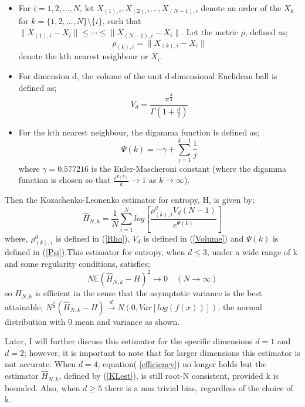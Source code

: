 \documentclass{article}
\begin{document}
\begin{itemize}

\item For $i = 1, 2, ..., N$, let $X_{(1), i}, X_{(2), i}, .., X_{(N-1), i}$ denote an order of the $X_{k}$ for $k = \{1, 2, ..., N\} \setminus \{i\}$, such that $\| X_{(1), i} - X_{i}\| \leq \cdots \leq \|  X_{(N-1), i} - X_{i}\| $. Let the metric $\rho$, defined as;
\begin{equation} \label{Rho}
\rho_{(k), i} = \| X_{(k), i} - X_{i}\|
\end{equation} denote the kth nearest neighbour or $X_{i}$.

\item  For dimension d, the volume of the unit d-dimensional Euclidean ball is defined as;
\begin{equation} \label{Volume}
V_{d} = \frac{\pi^\frac{d}{2}}{\Gamma(1 + \frac{d}{2})}
\end{equation}

\item For the kth nearest neighbour, the digamma function is defined as;
\begin{equation} \label{Psi}
\Psi(k) = -\gamma + \sum_{j=1}^{k-1} \frac{1}{j}
\end{equation}
where $\gamma = 0.577216$ is the Euler-Mascheroni constant (where the digamma function is chosen so that $\frac{e^{\Psi(k)}}{k}\to1$ as $k \to \infty$).

\end{itemize} Then the Kozachenko-Leonenko estimator for entropy, H, is given by;
\begin{equation} \label{KLest}
\hat{H}_{N, k} = \frac{1}{N} \sum_{i=1}^{N} log \left[ \frac{\rho_{(k),i}^{d} V_{d} (N-1)}{e^{\Psi(k)}} \right]
\end{equation} where, $\rho_{(k),i}^{d}$ is defined in (\ref{Rho}), $V_{d}$ is defined in (\ref{Volume}) and $\Psi(k)$ is defined in (\ref{Psi}).This estimator for entropy, when $d \leq 3$, under a wide range of k and some regularity conditions, satisfies;
\begin{equation} \label{efficiency}
N \mathbb{E} {(\hat{H}_{N, k} - H)^2} \to 0 \quad  (N \to \infty)
\end{equation} so $\hat{H}_{N, k}$ is efficient in the sense that the asymptotic variance is the best attainable; $N^{\frac{1}{2}}(\hat{H}_{N, k} - H) \xrightarrow{d} N(0, Var[log(f(x))])$, the normal distribution with 0 mean and variance as shown.

Later, I will further discuss this estimator for the specific dimensions $d=1$ and $d=2$; however, it is important to note that for larger dimensions this estimator is not accurate. When $d=4$, equation( \ref{efficiency}) no longer holds but the estimator $\hat{H}_{N, k}$, defined by (\ref{KLest}), is still root-N consistent, provided k is bounded. Also, when $d \geq 5$ there is a non trivial bias, regardless of the choice of k. 
\end{document}

